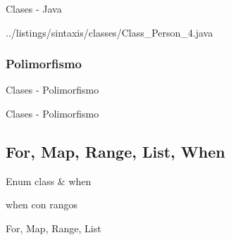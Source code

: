 		\begin{frame}[fragile]{Clases - Java}	
			
				{../listings/sintaxis/classes/Class_Person_4.java}
		\end{frame}
		
		\subsubsection{Polimorfismo} %
		
			\begin{frame}[fragile]{Clases - Polimorfismo}	
				
			\end{frame}
			
			\begin{frame}[fragile]{Clases - Polimorfismo}	
				
			\end{frame}
			
	\subsection{For, Map, Range, List, When} %
	
		\begin{frame}[fragile]{Enum class \& when}	
			
		\end{frame}
		
		\begin{frame}[fragile]{when con rangos}	
			
		\end{frame}
		
		\begin{frame}[fragile]{For, Map, Range, List}	
			
		\end{frame}
